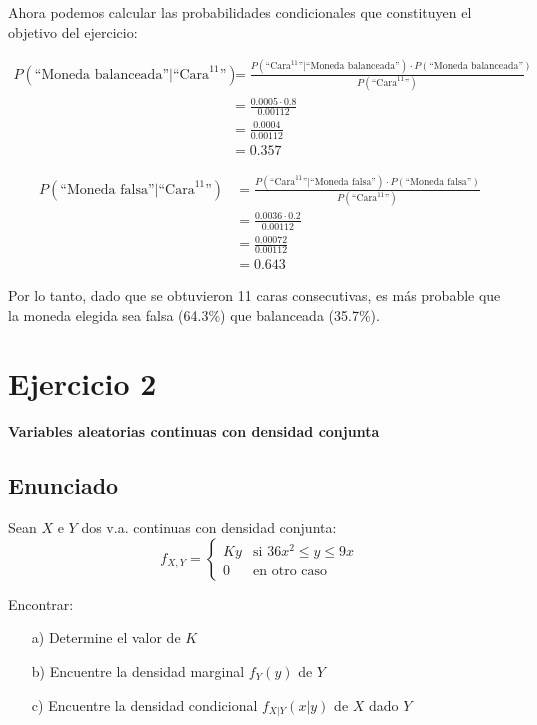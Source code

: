 \documentclass[11pt,a4paper]{article}
\begin{document}
Ahora podemos calcular las probabilidades condicionales que constituyen el objetivo del ejercicio:

\begin{align*}
P(\text{``Moneda balanceada''} | \text{``Cara}^{11}\text{''}) &= \frac{P(\text{``Cara}^{11}\text{''} | \text{``Moneda balanceada''}) \cdot P(\text{``Moneda balanceada''})}{P(\text{``Cara}^{11}\text{''})} \\
&= \frac{0.0005 \cdot 0.8}{0.00112} \\
&= \frac{0.0004}{0.00112} \\
&= 0.357
\end{align*}

\begin{align*}
P(\text{``Moneda falsa''} | \text{``Cara}^{11}\text{''}) &= \frac{P(\text{``Cara}^{11}\text{''} | \text{``Moneda falsa''}) \cdot P(\text{``Moneda falsa''})}{P(\text{``Cara}^{11}\text{''})} \\
&= \frac{0.0036 \cdot 0.2}{0.00112} \\
&= \frac{0.00072}{0.00112} \\
&= 0.643
\end{align*}

Por lo tanto, dado que se obtuvieron 11 caras consecutivas, es más probable que la moneda elegida sea falsa (64.3\%) que balanceada (35.7\%).

\section{Ejercicio 2}
\textbf{Variables aleatorias continuas con densidad conjunta}

\subsection{Enunciado}
Sean $X$ e $Y$ dos v.a. continuas con densidad conjunta:
\[
f_{X,Y} = \begin{cases}
Ky & \text{si } 36x^2 \leq y \leq 9x \\
0 & \text{en otro caso}
\end{cases}
\]

Encontrar:
\begin{enumerate}
    \item[a)] Determine el valor de $K$
    \item[b)] Encuentre la densidad marginal $f_Y(y)$ de $Y$
    \item[c)] Encuentre la densidad condicional $f_{X|Y}(x|y)$ de $X$ dado $Y$
\end{enumerate}
\end{document}
